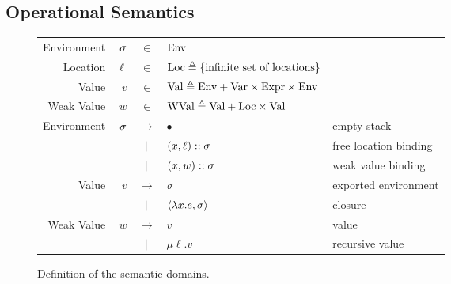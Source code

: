 \subsection{Operational Semantics}
\begin{figure}[h!]
  \centering
  \begin{tabular}{rrcll}
    Environment & $\sigma$ & $\in$         & $\text{Env}$                                                                        \\
    Location    & $\ell$ & $\in$         & $\text{Loc}\triangleq\{\text{infinite set of locations}\}$                          \\
    Value       & $v$    & $\in$         & $\text{Val} \triangleq\text{Env}+\text{Var}\times\text{Expr}\times\text{Env}$                         \\
    Weak Value  & $w$    & $\in$         & $\text{WVal}\triangleq\text{Val}+\text{Loc}\times\text{Val}$                                     \\
    Environment & $\sigma$ & $\rightarrow$ & $\bullet$                                             & empty stack           \\
                &        & $|$       & $(x,\ell)::\sigma$                                   & free location binding \\
                &        & $|$       & $(x,w):: \sigma$                                     & weak value binding    \\
    Value       & $v$    & $\rightarrow$ & $\sigma$                                                & exported environment  \\
                &        & $|$       & $\langle \lambda x.e, \sigma \rangle$                   & closure               \\
    Weak Value  & $w$    & $\rightarrow$ & $v$                                                   & value                 \\
                &        & $|$       & $\mu\ell.v$                                           & recursive value
  \end{tabular}
  \caption{Definition of the semantic domains.}
  \label{fig:domain}
\end{figure}
